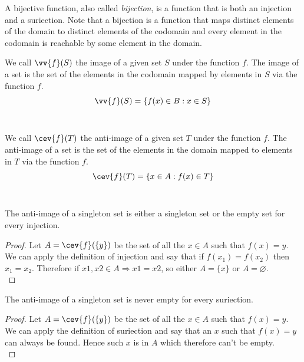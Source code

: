 \begin{definition}[Bijection]
\label{def:bijection}
    A bijective function, also called \emph{bijection}, is a function that is both an 
    injection and a suriection. Note that a bijection is a function that maps distinct 
    elements of the domain to distinct elements of the codomain and every element in the 
    codomain is reachable by some element in the domain. \\
\end{definition}
\newpage

\begin{definition}[Image]
    We call $\vv{f}(S)$ the image of a given set $S$ under the function $f$. The 
    image of a set is the set of the elements in the codomain mapped by elements in $S$ 
    via the function $f$. \\

    $$ \vv{f}(S) = \{ f(x) \in B : x \in S \} $$ \\
\end{definition}


\begin{definition}
    We call $\cev{f}(T)$ the anti-image of a given set $T$ under the function $f$. The 
    anti-image of a set is the set of the elements in the domain mapped to elements in $T$ 
    via the function $f$. \\

    $$ \cev{f}(T) = \{ x \in A : f(x) \in T \} $$ \\
\end{definition}


\begin{lemma} 
    The anti-image of a singleton set is either a singleton set or the empty set for every 
    injection. \\
\end{lemma}
\begin{proof}
    Let $A = \cev{f}(\{y\})$ be the set of all the $x \in A$ such that $f(x) = y$.
    We can apply the definition of injection and say that if $f(x_1) = f(x_2)$ 
    then $x_1 = x_2$. Therefore if $x1,x2 \in A \Rightarrow x1 = x2$, so either $A = \{x\}$ or $A = \varnothing$. \\
\end{proof}

\begin{lemma} 
    The anti-image of a singleton set is never empty for every 
    suriection. \\
\end{lemma}
\begin{proof}
    Let $A = \cev{f}(\{y\})$ be the set of all the $x \in A$ such that $f(x) = y$.
    We can apply the definition of suriection and say that an $x$ such that $f(x) = y$ can always be found. 
    Hence such $x$ is in $A$ which therefore can't be empty. \\
\end{proof}

